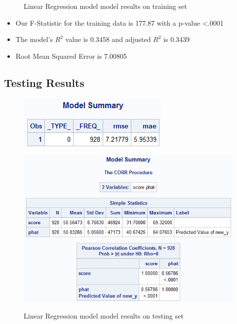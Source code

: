 \documentclass[12pt]{article}
\begin{document}
\begin{figure}[h]
\begin{minipage}[t]{0.55\textwidth}
        \label{fig:unemp_measures}
    \end{minipage}
    \caption{Linear Regression model model results on training set}
    \label{fig:unemp_fig}
\end{figure}
\begin{itemize}
    \item Our F-Statistic for the training data is 177.87 with a p-value \textless .0001
    \item The model's $R^2$ value is 0.3458 and adjusted $R^2$ is 0.3439
    \item Root Mean Squared Error is 7.00805
\end{itemize}

\subsection{Testing Results}
\begin{figure}[h]
    \centering
    \begin{minipage}[t]{0.4\textwidth}
        \vspace{40pt}
        \centering
        \includegraphics[width=\textwidth]{images/testing_model1.png}
        \label{fig:unemp_dist}
    \end{minipage}\hfill
    \begin{minipage}[t]{0.55\textwidth}
        \vspace{0pt}
        \centering
        \includegraphics[width=\textwidth]{images/testing_model2.png}
        
        \label{fig:unemp_measures}
    \end{minipage}
    \caption{Linear Regression model model results on testing set}
    \label{fig:unemp_fig}
\end{figure}
\end{document}
